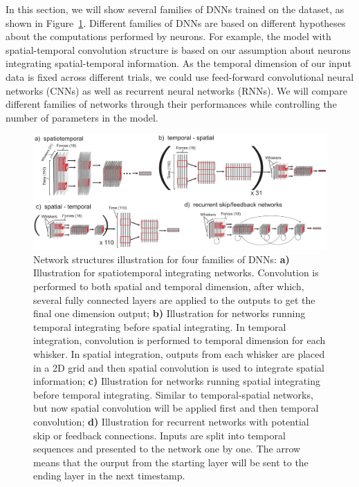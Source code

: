 In this section, we will show several families of DNNs trained on the dataset, as shown in Figure~\ref{fig_archi}. Different families of DNNs are based on different hypotheses about the computations performed by neurons.
For example, the model with spatial-temporal convolution structure is based on our assumption about neurons integrating spatial-temporal information.
As the temporal dimension of our input data is fixed across different trials, we could use feed-forward convolutional neural networks (CNNs) as well as recurrent neural networks (RNNs).
We will compare different families of networks through their performances while controlling the number of parameters in the model.

\begin{figure}[h]
\centering
\includegraphics [width=1\linewidth]{figures/architectures.pdf}
\vspace{-2mm}
\caption{Network structures illustration for four families of DNNs: \textbf{a)} Illustration for spatiotemporal integrating networks. Convolution is performed to both spatial and temporal dimension, after which, several fully connected layers are applied to the outputs to get the final one dimension output; \textbf{b)} Illustration for networks running temporal integrating before spatial integrating. In temporal integration, convolution is performed to temporal dimension for each whisker. In spatial integration, outputs from each whisker are placed in a 2D grid and then spatial convolution is used to integrate spatial information; \textbf{c)} Illustration for networks running spatial integrating before temporal integrating. Similar to temporal-spatial networks, but now spatial convolution will be applied first and then temporal convolution; \textbf{d)} Illustration for recurrent networks with potential skip or feedback connections. Inputs are split into temporal sequences and presented to the network one by one. The arrow means that the ourput from the starting layer will be sent to the ending layer in the next timestamp.~\label{fig_archi}}
\end{figure}

